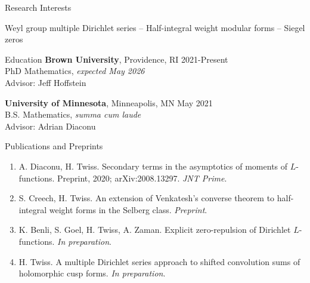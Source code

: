 \documentclass{resume} %
\begin{document}
\begin{rSection}{Research Interests}
\begin{center}Weyl group multiple Dirichlet series -- Half-integral weight modular forms -- Siegel zeros\end{center}
\end{rSection}

\begin{rSection}{Education}
{\bf Brown University}, Providence, RI \hfill {2021-Present} \\
PhD Mathematics, \textit{expected May 2026} \\
\hphantom{\quad}Advisor: Jeff Hoffstein

{\bf University of Minnesota}, Minneapolis, MN \hfill {May 2021} \\
B.S. Mathematics, \textit{summa cum laude} \\
\hphantom{\quad}Advisor: Adrian Diaconu
\end{rSection}

\begin{rSection}{Publications and Preprints}
\begin{enumerate}
    \item {A. Diaconu, H. Twiss. Secondary terms in the asymptotics of moments of $L$-functions. Preprint,
2020; arXiv:2008.13297. \textit{JNT Prime}.}
\item {S. Creech, H. Twiss. An extension of Venkatesh's converse theorem to half-integral weight forms in the Selberg class. \textit{Preprint}.}
\item {K. Benli, S. Goel, H. Twiss, A. Zaman. Explicit zero-repulsion of Dirichlet $L$-functions. \textit{In preparation}.}
\item {H. Twiss. A multiple Dirichlet series approach to shifted convolution sums of holomorphic cusp forms. \textit{In preparation}.}
\end{enumerate}
\end{rSection}
\end{document}
